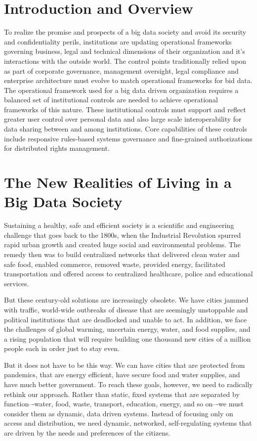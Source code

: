 \section{Introduction and Overview}

To realize the promise and prospects of a big data society and avoid its security and confidentiality perils, institutions are updating operational frameworks governing business, legal and technical dimensions of their organization and it's interactions with the outside world.
The control points traditionally relied upon as part of corporate governance, management oversight, legal compliance and enterprise architecture must evolve to match operational frameworks for bid data.
The operational framework used for a big data driven organization requires a balanced set of institutional controls are needed to achieve operational frameworks of this nature.
These institutional controls must support and reflect greater user control over personal data and also large scale interoperability for data sharing between and among institutions.
Core capabilities of these controls include responsive rules-based systems governance and fine-grained authorizations for distributed rights management.

\section{The New Realities of Living in a Big Data Society}

Sustaining a healthy, safe and efficient society is a scientific and engineering challenge that goes back to the 1800s, when the Industrial Revolution spurred rapid urban growth and created huge social and environmental problems.
The remedy then was to build centralized networks that delivered clean water and safe food, enabled commerce, removed waste, provided energy, facilitated transportation and offered access to centralized healthcare, police and educational services.

But these century-old solutions are increasingly obsolete.
We have cities jammed with traffic, world-wide outbreaks of disease that are seemingly unstoppable and political institutions that are deadlocked and unable to act.
In addition, we face the challenges of global warming, uncertain energy, water, and food supplies, and a rising population that will require building one thousand new cities of a million people each in order just to stay even.

But it does not have to be this way.
We can have cities that are protected from pandemics, that are energy efficient, have secure food and water supplies, and have much better government.
To reach these goals, however, we need to radically rethink our approach.
Rather than static, fixed systems that are separated by function–-water, food, waste, transport, education, energy, and so on–-we must consider them as dynamic, data driven systems.
Instead of focusing only on access and distribution, we need dynamic, networked, self-regulating systems that are driven by the needs and preferences of the citizens.

